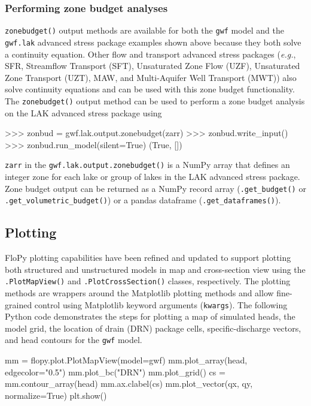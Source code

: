 \documentclass[12pt, oneside]{article}  	%
\begin{document}
\subsubsection*{Performing zone budget analyses}

\texttt{zonebudget()} output methods are available for both the \texttt{gwf} model and the \texttt{gwf.lak} advanced stress package examples shown above because they both solve a continuity equation. Other flow and transport advanced stress packages (\textit{e.g.}, SFR, Streamflow Transport (SFT), Unsaturated Zone Flow (UZF), Unsaturated Zone Transport (UZT), MAW, and Multi-Aquifer Well Transport (MWT)) also solve continuity equations and can be used with this zone budget functionality. The \texttt{zonebudget()} output method can be used to perform a zone budget analysis on the LAK advanced stress package using

\begin{python}
>>> zonbud = gwf.lak.output.zonebudget(zarr)
>>> zonbud.write_input()
>>> zonbud.run_model(silent=True)
(True, [])
\end{python}

\noindent \texttt{zarr} in the \texttt{gwf.lak.output.zonebudget()} is a NumPy array that defines an integer zone for each lake or group of lakes in the LAK advanced stress package. Zone budget output can be returned as a NumPy record array (\texttt{.get\_budget()} or \texttt{.get\_volumetric\_budget()}) or a pandas dataframe (\texttt{.get\_dataframes()}).

\subsection*{Plotting} \label{sec:plotting}

FloPy plotting capabilities have been refined and updated to support plotting both structured and unstructured models in map and cross-section view using the \texttt{.PlotMapView()} and \texttt{.PlotCrossSection()} classes, respectively. The plotting methods are wrappers around the Matplotlib plotting methods \citep{hunter2007matplotlib} and allow fine-grained control using Matplotlib keyword arguments (\texttt{kwargs}). The following Python code demonstrates the steps for plotting a map of simulated heads, the model grid, the location of drain (DRN) package cells, specific-discharge vectors, and head contours for the \texttt{gwf} model.

\begin{python}
mm = flopy.plot.PlotMapView(model=gwf)
mm.plot_array(head, edgecolor="0.5")
mm.plot_bc("DRN")
mm.plot_grid()
cs = mm.contour_array(head)
mm.ax.clabel(cs)
mm.plot_vector(qx, qy, normalize=True)
plt.show()
\end{python}
\end{document}
